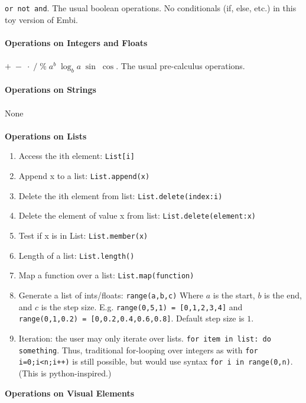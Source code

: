 \documentclass[12pt]{article}
\theoremstyle{remark}
\newcommand{\ttt}[1]{\texttt{#1}}
\begin{document}
\ttt{or not and}. The usual boolean operations. No conditionals (if, else, etc.) in this toy version of Embi.
\\\\
\textbf{Operations on Integers and Floats}
\\\\
$+ \; - \;  \cdot  \; / \; \% \; a^b \; \log_b a \; \sin \; \cos$. The usual pre-calculus operations.
\\\\
\textbf{Operations on Strings}
\\\\
None
\\\\
\textbf{Operations on Lists}
\begin{enumerate}
\item Access the ith element: \ttt{List[i]}
\item Append x to a list: \ttt{List.append(x)}
\item Delete the ith element from list: \ttt{List.delete(index:i)}
\item Delete the element of value x from list: \ttt{List.delete(element:x)}
\item Test if x is in List: \ttt{List.member(x)}
\item Length of a list: \ttt{List.length()}
\item Map a function over a list: \ttt{List.map(function)}
\item Generate a list of ints/floats: \ttt{range(a,b,c)} Where $a$ is the start, $b$ is the end, and $c$ is the step size. E.g. \ttt{range(0,5,1) = [0,1,2,3,4]} and \\ \ttt{range(0,1,0.2) = [0,0.2,0.4,0.6,0.8]}. Default step size is $1$.
\item Iteration: the user may only iterate over lists. \ttt{for item in list: do something}. Thus, traditional for-looping over integers as with \ttt{for i=0;i<n;i++)} is still possible, but would use syntax \ttt{for i in range(0,n)}. (This is python-inspired.)
\end{enumerate}
\textbf{Operations on Visual Elements}
\end{document}
